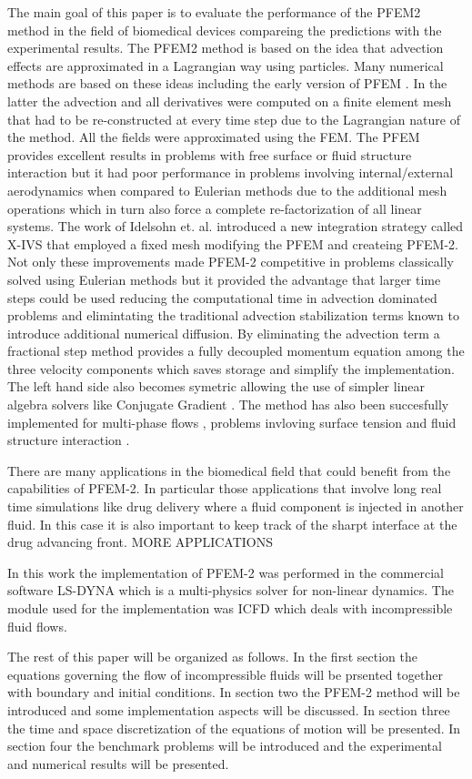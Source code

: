 The main goal of this paper is to evaluate the performance of the PFEM2 method in the field of biomedical devices compareing the predictions with the experimental results. The PFEM2 method is based on the idea that advection effects are approximated in a Lagrangian way using particles. Many numerical methods are based on these ideas \cite{sph,pic,mac,mps,mpm} including the early version of PFEM \cite{sergio:pfem}. In the latter the advection and all derivatives were computed on a finite element mesh that had to be re-constructed at every time step due to the Lagrangian nature of the method. All the fields were approximated using the FEM. The PFEM provides excellent results in problems with free surface or fluid structure interaction but it had poor performance in problems involving internal/external aerodynamics when compared to Eulerian methods due to the additional mesh operations which in turn also force a complete re-factorization of all linear systems. The work of Idelsohn et. al. \cite{sergio:xivs1,sergio:xivs2} introduced a new integration strategy called X-IVS that employed a fixed mesh modifying the PFEM and createing PFEM-2. Not only these improvements made PFEM-2 competitive in problems classically solved using Eulerian methods but it provided the advantage that larger time steps could be used \cite{gimenez:parallel} reducing the computational time in advection dominated problems and elimintating the traditional advection stabilization terms known to introduce additional numerical diffusion. By eliminating the advection term a fractional step method provides a fully decoupled momentum equation among the three velocity components which saves storage and simplify the implementation. The left hand side also becomes symetric allowing the use of simpler linear algebra solvers like Conjugate Gradient \cite{conjgrad}. The method has also been succesfully implemented for multi-phase flows \cite{sergio:pfem2_lts,gimenez:fs,gimenez:tesis}, problems invloving surface tension \cite{gimenez:st} and fluid structure interaction \cite{pablo:FSI}.

There are many applications in the biomedical field that could benefit from the capabilities of PFEM-2. In particular those applications that involve long real time simulations like drug delivery where a fluid component is injected in another fluid. In this case it is also important to keep track of the sharpt interface at the drug advancing front. {MORE APPLICATIONS}

In this work the implementation of PFEM-2 was performed in the commercial software LS-DYNA\textsuperscript{\textregistered} which is a multi-physics solver for non-linear dynamics. The module used for the implementation was ICFD which deals with incompressible fluid flows. 

The rest of this paper will be organized as follows. 
In the first section the equations governing the flow of incompressible fluids will be prsented together with boundary and initial conditions. 
In section two the PFEM-2 method will be introduced and some implementation aspects will be discussed.
In section three the time and space discretization of the equations of motion will be presented. 
In section four the benchmark problems will be introduced and the experimental and numerical results will be presented.
